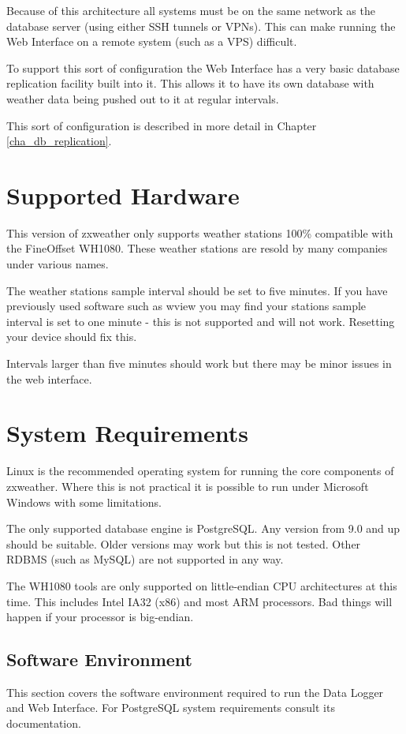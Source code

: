 \documentclass[a4paper,10pt,draft]{book}
\begin{document}
Because of this architecture all systems must be on the same network as the database server (using either SSH tunnels or VPNs). This can make running the Web Interface on a remote system (such as a VPS) difficult.

To support this sort of configuration the Web Interface has a very basic database replication facility built into it. This allows it to have its own database with weather data being pushed out to it at regular intervals.

This sort of configuration is described in more detail in Chapter \ref{cha_db_replication}.

\section{Supported Hardware}
This version of zxweather only supports weather stations 100\% compatible with the FineOffset WH1080. These weather stations are resold by many companies under various names.

The weather stations sample interval should be set to five minutes. If you have previously used software such as wview you may find your stations sample interval is set to one minute - this is not supported and will not work. Resetting your device should fix this.

Intervals larger than five minutes should work but there may be minor issues in the web interface.

\section{System Requirements}
Linux is the recommended operating system for running the core components of zxweather. Where this is not practical it is possible to run under Microsoft Windows with some limitations.

The only supported database engine is PostgreSQL. Any version from 9.0 and up should be suitable. Older versions may work but this is not tested. Other RDBMS (such as MySQL) are not supported in any way.

The WH1080 tools are only supported on little-endian CPU architectures at this time. This includes Intel IA32 (x86) and most ARM processors. Bad things will happen if your processor is big-endian.

\subsection{Software Environment}
This section covers the software environment required to run the Data Logger and Web Interface. For PostgreSQL system requirements consult its documentation.
\end{document}
